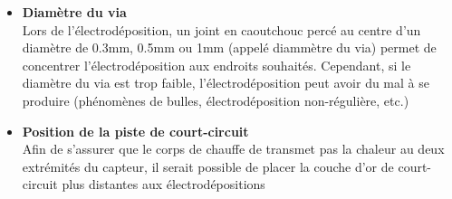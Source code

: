 \begin{itemize}
    \item \textbf{Diamètre du via}\\
          Lors de l'électrodéposition, un joint en caoutchouc percé au centre d'un diamètre de 0.3mm, 0.5mm ou 1mm (appelé diammètre du via) permet de concentrer
          l'électrodéposition aux endroits souhaités. Cependant, si le diamètre du via est trop faible, l'électrodéposition peut avoir du mal à
          se produire (phénomènes de bulles, électrodéposition non-régulière, etc.)\\

    \item \textbf{Position de la piste de court-circuit}\\
          Afin de s'assurer que le corps de chauffe de transmet pas la chaleur au deux extrémités du capteur, il serait possible de placer la couche
          d'or de court-circuit plus distantes aux électrodépositions
\end{itemize}

